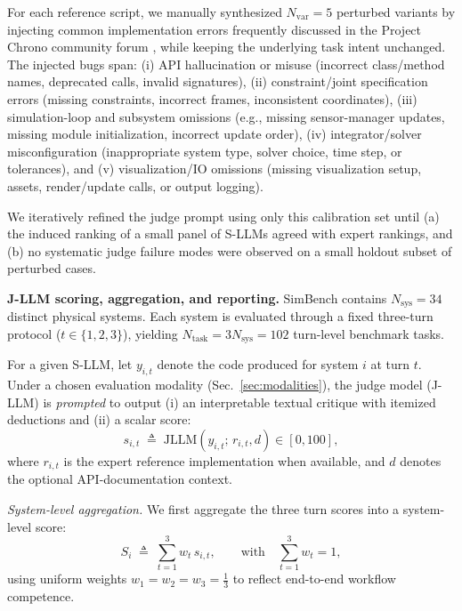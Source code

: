 For each reference script, we manually synthesized $N_{\text{var}}=5$ perturbed variants by injecting common implementation errors frequently discussed in the Project Chrono community forum \cite{projectChronoForum}, while keeping the underlying task intent unchanged. The injected bugs span: (i) API hallucination or misuse (incorrect class/method names, deprecated calls, invalid signatures), (ii) constraint/joint specification errors (missing constraints, incorrect frames, inconsistent coordinates), (iii) simulation-loop and subsystem omissions (e.g., missing sensor-manager updates, missing module initialization, incorrect update order), (iv) integrator/solver misconfiguration (inappropriate system type, solver choice, time step, or tolerances), and (v) visualization/IO omissions (missing visualization setup, assets, render/update calls, or output logging).

We iteratively refined the judge prompt using only this calibration set until (a) the induced ranking of a small panel of S-LLMs agreed with expert rankings, and (b) no systematic judge failure modes were observed on a small holdout subset of perturbed cases.

\medskip

\noindent\textbf{J-LLM scoring, aggregation, and reporting.}
SimBench contains $N_{\text{sys}}=34$ distinct physical systems. Each system is evaluated through a fixed three-turn protocol ($t\in\{1,2,3\}$), yielding $N_{\text{task}}=3N_{\text{sys}}=102$ turn-level benchmark tasks.

For a given S-LLM, let $y_{i,t}$ denote the code produced for system $i$ at turn $t$. Under a chosen evaluation modality (Sec.~\ref{sec:modalities}), the judge model (J-LLM) is \emph{prompted} to output (i) an interpretable textual critique with itemized deductions and (ii) a scalar score:
\begin{equation}
s_{i,t} \;\triangleq\; \mathrm{JLLM}\!\left(y_{i,t};\, r_{i,t}, d\right)\in[0,100],
\end{equation}
where $r_{i,t}$ is the expert reference implementation when available, and $d$ denotes the optional API-documentation context.

\vspace{2pt}
\noindent\emph{System-level aggregation.}
We first aggregate the three turn scores into a system-level score:
\begin{equation}
S_i \;\triangleq\; \sum_{t=1}^{3} w_t\, s_{i,t},
\qquad \text{with}\quad \sum_{t=1}^{3} w_t = 1,
\label{eq:sys_agg}
\end{equation}
using uniform weights $w_1=w_2=w_3=\tfrac{1}{3}$ to reflect end-to-end workflow competence.
\vspace{2pt}

